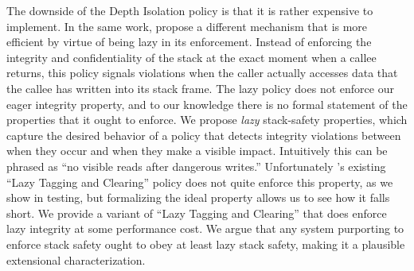 \documentclass[acmsmall,review,anonymous]{acmart}\settopmatter{printfolios=true,printccs=false,printacmref=false}
\begin{document}
The downside of the Depth Isolation policy is that it is rather expensive to implement.
In the same work, \citeauthor{DBLP:conf/sp/RoesslerD18} propose a different mechanism
that is more efficient by virtue of being lazy in its enforcement.
Instead of enforcing the integrity and confidentiality of the stack at the
exact moment when a callee returns, this policy signals violations when the
caller actually accesses data that the callee has written into its stack
frame. \ifaftersubmission{}\fi
The lazy policy does not enforce our eager integrity property, and to our
knowledge there is no formal statement of the properties that it ought to enforce.
We propose {\em lazy} stack-safety properties, which capture the desired behavior of a
policy that detects integrity violations between when they occur and when they make
a visible impact. Intuitively this can be phrased as ``no visible reads after dangerous
writes.'' Unfortunately \citeauthor{DBLP:conf/sp/RoesslerD18}'s existing
``Lazy Tagging and Clearing'' policy does not quite enforce this property, as we show in
testing, but formalizing the ideal property allows us to see how it falls short.
We provide a variant of ``Lazy Tagging and Clearing'' that does enforce lazy integrity
at some performance cost.
We argue that any system purporting to enforce stack safety ought to obey at least lazy
stack safety, making it a plausible extensional characterization.

\end{document}
